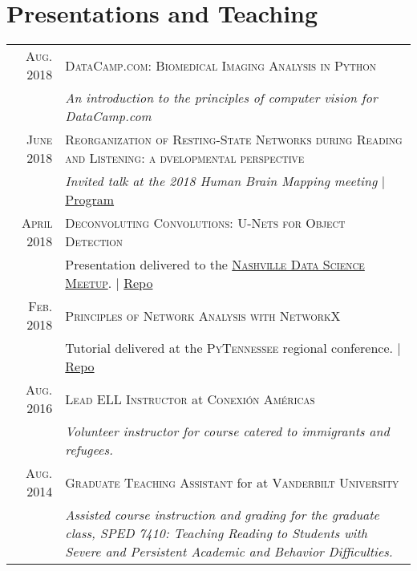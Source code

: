 \documentclass[a4paper,10pt]{article}
\begin{document}
\section{Presentations and Teaching}
\begin{longtable}{rp{11cm}}
    \textsc{Aug.} 2018 & \textsc{DataCamp.com: Biomedical Imaging Analysis in Python} \\
    & \emph{An introduction to the principles of computer vision for DataCamp.com} \smallskip \\

    \textsc{June} 2018 & \textsc{Reorganization of Resting-State Networks during Reading and Listening: a dvelopmental perspective} \\
    & \emph{Invited talk at the 2018 Human Brain Mapping meeting} | \href{https://ww5.aievolution.com/hbm1801/index.cfm?do=ev.viewEv&ev=1362}{Program} \smallskip \\

    \textsc{April} 2018 & \textsc{Deconvoluting Convolutions: U-Nets for Object Detection}\\
    & Presentation delivered to the \href{https://www.meetup.com/Data-Science-Nashville/events/249853957/}{\textsc{Nashville Data Science Meetup}}. | \href{https://github.com/stkbailey/deconv-conv)}{Repo} \smallskip \\

    \textsc{Feb.} 2018 & \textsc{Principles of Network Analysis with NetworkX}\\
    & Tutorial delivered at the \textsc{PyTennessee} regional conference. | \href{https://github.com/stkbailey/nashnetx/presentations}{Repo}  \smallskip\\

    \textsc{Aug. 2016} & \textsc{Lead ELL Instructor} at \textsc{Conexi\'on Am\'ericas} \\
    & \emph{Volunteer instructor for course catered to immigrants and refugees.} \\ 
    
    \textsc{Aug. 2014} & \textsc{Graduate Teaching Assistant} for at \textsc{Vanderbilt University} \\
    & \emph{Assisted course instruction and grading for the graduate class, \textit{SPED 7410: Teaching Reading to Students with Severe and Persistent Academic and Behavior Difficulties}.} \\ 
    
\end{longtable}
\end{document}
